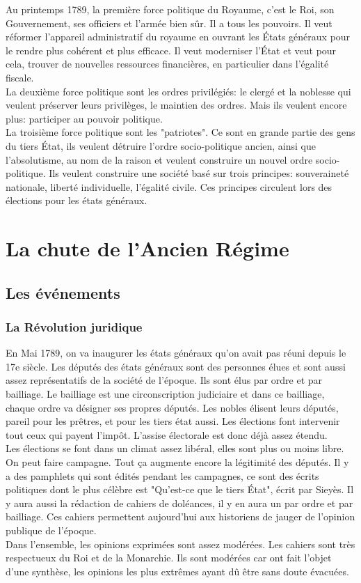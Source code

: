 \documentclass[10pt, a4paper, openany]{book}
\begin{document}
Au printemps 1789, la première force politique du Royaume, c'est le Roi, son Gouvernement, ses officiers et l'armée bien sûr. Il a tous les pouvoirs. Il veut réformer l'appareil administratif du royaume en ouvrant les États généraux pour le rendre plus cohérent et plus efficace. Il veut moderniser l'État et veut pour cela, trouver de nouvelles ressources financières, en particulier dans l'égalité fiscale. \\
La deuxième force politique sont les ordres privilégiés: le clergé et la noblesse qui veulent préserver leurs privilèges, le maintien des ordres. Mais ils veulent encore plus: participer au pouvoir politique. \\
La troisième force politique sont les "patriotes". Ce sont en grande partie des gens du tiers État, ils veulent détruire l'ordre socio-politique ancien, ainsi que l'absolutisme, au nom de la raison et veulent construire un nouvel ordre socio-politique. Ils veulent construire une société basé sur trois principes: souveraineté nationale, liberté individuelle, l'égalité civile. Ces principes circulent lors des élections pour les états généraux. 

\section{La chute de l'Ancien Régime}

\subsection{Les événements}

\subsubsection{La Révolution juridique}

En Mai 1789, on va inaugurer les états généraux qu'on avait pas réuni depuis le 17e siècle. Les députés des états généraux sont des personnes élues et sont aussi assez représentatifs de la société de l'époque. Ils sont élus par ordre et par bailliage. Le bailliage est une circonscription judiciaire et dans ce bailliage, chaque ordre va désigner ses propres députés. Les nobles élisent leurs députés, pareil pour les prêtres, et pour les tiers état aussi. Les élections font intervenir tout ceux qui payent l'impôt. L'assise électorale est donc déjà assez étendu. \\
Les élections se font dans un climat assez libéral, elles sont plus ou moins libre. On peut faire campagne. Tout ça augmente encore la légitimité des députés. Il y a des pamphlets qui sont édités pendant les campagnes, ce sont des écrits politiques dont le plus célèbre est "Qu'est-ce que le tiers État", écrit par Sieyès. Il y aura aussi la rédaction de cahiers de doléances, il y en aura un par ordre et par bailliage. Ces cahiers permettent aujourd'hui aux historiens de jauger de l'opinion publique de l'époque. \\
Dans l'ensemble, les opinions exprimées sont assez modérées. Les cahiers sont très respectueux du Roi et de la Monarchie. Ils sont modérées car ont fait l'objet d'une synthèse, les opinions les plus extrêmes ayant dû être sans doute évacuées. 
\end{document}
